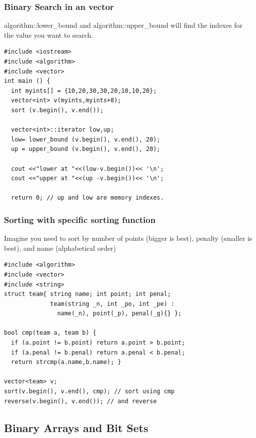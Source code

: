 \documentclass{beamer}
\begin{document}
\begin{frame}[fragile]
  \frametitle{Binary Search in an vector}
  
  {\small algorithm::lower\_bound and algorithm::upper\_bound
    will find the indexes for the value you want to search.
   
  \begin{block}{}
\begin{verbatim} 
#include <iostream>     
#include <algorithm>    
#include <vector>       
int main () {
  int myints[] = {10,20,30,30,20,10,10,20};
  vector<int> v(myints,myints+8);           
  sort (v.begin(), v.end());                

  vector<int>::iterator low,up;
  low= lower_bound (v.begin(), v.end(), 20); 
  up = upper_bound (v.begin(), v.end(), 20); 

  cout <<"lower at "<<(low-v.begin())<< '\n';
  cout <<"upper at "<<(up -v.begin())<< '\n';

  return 0; // up and low are memory indexes.
\end{verbatim}
  \end{block}
}
\end{frame}
  

\begin{frame}[fragile]
  \frametitle{Sorting with specific sorting function}
{\small
  Imagine you need to sort by number of points (bigger is best),
  penalty (smaller is best), and name (alphabetical order)

  \begin{block}{}
\begin{verbatim}
#include <algorithm>
#include <vector>
#include <string>
struct team{ string name; int point; int penal; 
             team(string _n, int _po, int _pe) : 
               name(_n), point(_p), penal(_g){} };

bool cmp(team a, team b) {
  if (a.point != b.point) return a.point > b.point;
  if (a.penal != b.penal) return a.penal < b.penal;
  return strcmp(a.name,b.name); }

vector<team> v;
sort(v.begin(), v.end(), cmp); // sort using cmp
reverse(v.begin(), v.end()); // and reverse
\end{verbatim}
\end{block}}
\end{frame}

\subsection{Binary Arrays and Bit Sets}
\end{document}
